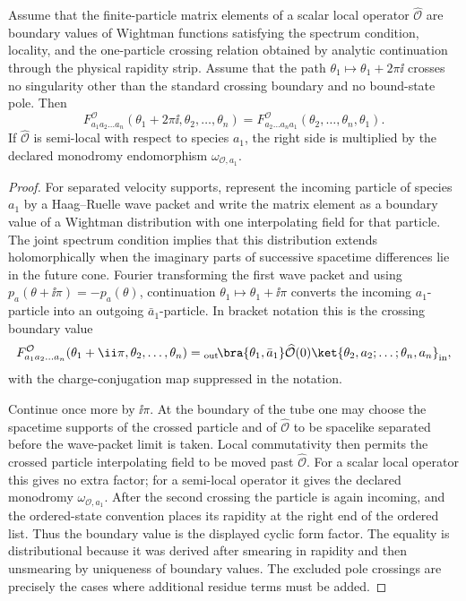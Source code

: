 \begin{proposition}
\label{prop:form-factor-cyclicity-crossing-locality}
Assume that the finite-particle matrix elements of a scalar local operator
\(\widehat{\mathcal O}\) are boundary values of Wightman functions satisfying
the spectrum condition, locality, and the one-particle crossing relation
obtained by analytic continuation through the physical rapidity strip.  Assume
that the path
\(\theta_1\mapsto\theta_1+2\pi\ii\) crosses no singularity other than the
standard crossing boundary and no bound-state pole.  Then
\[
  F^{\mathcal O}_{a_1a_2\ldots a_n}
  (\theta_1+2\pi\ii,\theta_2,\ldots,\theta_n)
  =
  F^{\mathcal O}_{a_2\ldots a_n a_1}
  (\theta_2,\ldots,\theta_n,\theta_1).
\]
If \(\widehat{\mathcal O}\) is semi-local with respect to species \(a_1\),
the right side is multiplied by the declared monodromy endomorphism
\(\omega_{\mathcal O,a_1}\).
\end{proposition}

\begin{proof}
For separated velocity supports, represent the incoming particle of species
\(a_1\) by a Haag--Ruelle wave packet and write the matrix element as a
boundary value of a Wightman distribution with one interpolating field for
that particle.  The joint spectrum condition implies that this distribution
extends holomorphically when the imaginary parts of successive spacetime
differences lie in the future cone.  Fourier transforming the first wave
packet and using \(p_a(\theta+\ii\pi)=-p_a(\theta)\), continuation
\(\theta_1\mapsto\theta_1+\ii\pi\) converts the incoming \(a_1\)-particle
into an outgoing \(\bar a_1\)-particle.  In bracket notation this is the
crossing boundary value
\[
  F^{\mathcal O}_{a_1a_2\ldots a_n}
  (\theta_1+\ii\pi,\theta_2,\ldots,\theta_n)
  =
  {}_{\rm out}\!\bra{\theta_1,\bar a_1}
  \widehat{\mathcal O}(0)
  \ket{\theta_2,a_2;\ldots;\theta_n,a_n}_{\rm in},
\]
with the charge-conjugation map suppressed in the notation.

Continue once more by \(\ii\pi\).  At the boundary of the tube one may choose
the spacetime supports of the crossed particle and of
\(\widehat{\mathcal O}\) to be spacelike separated before the wave-packet
limit is taken.  Local commutativity then permits the crossed particle
interpolating field to be moved past \(\widehat{\mathcal O}\).  For a scalar
local operator this gives no extra factor; for a semi-local operator it gives
the declared monodromy \(\omega_{\mathcal O,a_1}\).  After the second crossing
the particle is again incoming, and the ordered-state convention places its
rapidity at the right end of the ordered list.  Thus the boundary value is
the displayed cyclic form factor.  The equality is distributional because it
was derived after smearing in rapidity and then unsmearing by uniqueness of
boundary values.  The excluded pole crossings are precisely the cases where
additional residue terms must be added.
\end{proof}

